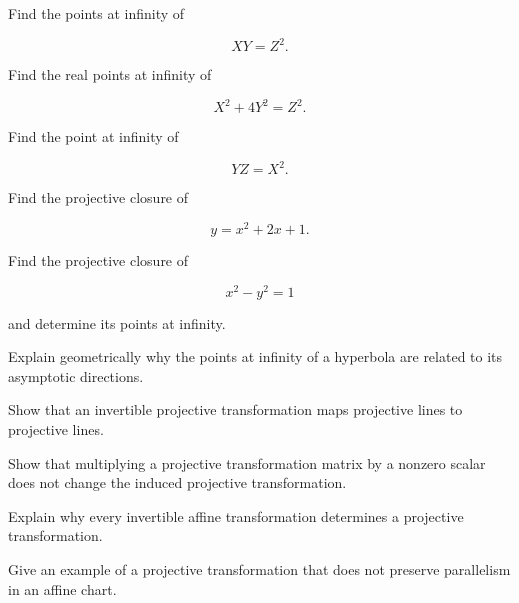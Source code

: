\begin{exercise}[2]
Find the points at infinity of

\[
XY=Z^2.
\]
\end{exercise}

\begin{exercise}[2]
Find the real points at infinity of

\[
X^2+4Y^2=Z^2.
\]
\end{exercise}

\begin{exercise}[2]
Find the point at infinity of

\[
YZ=X^2.
\]
\end{exercise}

\begin{exercise}[3]
Find the projective closure of

\[
y=x^2+2x+1.
\]
\end{exercise}

\begin{exercise}[3]
Find the projective closure of

\[
x^2-y^2=1
\]

and determine its points at infinity.
\end{exercise}

\begin{exercise}[3]
Explain geometrically why the points at infinity of a hyperbola are related
to its asymptotic directions.
\end{exercise}

\begin{exercise}[3]
Show that an invertible projective transformation maps projective lines to
projective lines.
\end{exercise}

\begin{exercise}[3]
Show that multiplying a projective transformation matrix by a nonzero scalar
does not change the induced projective transformation.
\end{exercise}

\begin{exercise}[3]
Explain why every invertible affine transformation determines a projective
transformation.
\end{exercise}

\begin{exercise}[3]
Give an example of a projective transformation that does not preserve
parallelism in an affine chart.
\end{exercise}

